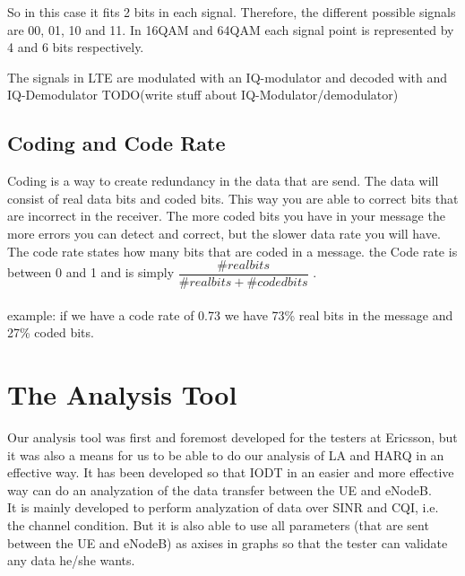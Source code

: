 \documentclass[cropmarks, frame, english]{idamasterthesis}
\begin{document}
 So in this case it fits 2 bits in each signal. Therefore, the different possible signals are 00, 01, 10 and 11. In 16QAM and 64QAM each signal point is represented by 4 and 6 bits respectively.

The signals in LTE are modulated with an IQ-modulator and decoded with and IQ-Demodulator 
TODO(write stuff about IQ-Modulator/demodulator)

\section{Coding and Code Rate}
Coding is a way to create redundancy in the data that are send. The data will consist of real data bits and coded bits. This way you are able to correct bits that are incorrect in the receiver. The more coded bits you have in your message the more errors you can detect and correct, but the slower data rate you will have. The code rate states how many bits that are coded in a message. the Code rate is between 0 and 1 and is simply $\dfrac{\# real bits}{ \# real bits + \# coded bits}$ . 
\\ \\
example: if we have a code rate of 0.73 we have 73\% real bits in the message and 27\% coded bits. 



\chapter{The Analysis Tool}
Our analysis tool was first and foremost developed for the testers at Ericsson, but it was also a means for us to be able to do our analysis of LA and HARQ in an effective way. It has been developed so that IODT in an easier and more effective way can do an analyzation of the data transfer between the UE and eNodeB. \\
It is mainly developed to perform analyzation of data over SINR and CQI, i.e. the channel condition. But it is also able to use all parameters (that are sent between the UE and eNodeB) as axises in graphs so that the tester can validate any data he/she wants.
\end{document}
